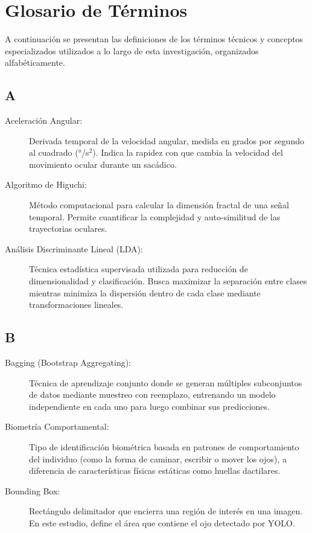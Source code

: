 \chapter*{Glosario de Términos}

A continuación se presentan las definiciones de los términos técnicos y conceptos especializados utilizados a lo largo de esta investigación, organizados alfabéticamente.

\section*{A}

\begin{description}
    \item[Aceleración Angular:] Derivada temporal de la velocidad angular, medida en grados por segundo al cuadrado (°/s$^2$). Indica la rapidez con que cambia la velocidad del movimiento ocular durante un sacádico.
    
    \item[Algoritmo de Higuchi:] Método computacional para calcular la dimensión fractal de una señal temporal. Permite cuantificar la complejidad y auto-similitud de las trayectorias oculares.
    
    \item[Análisis Discriminante Lineal (LDA):] Técnica estadística supervisada utilizada para reducción de dimensionalidad y clasificación. Busca maximizar la separación entre clases mientras minimiza la dispersión dentro de cada clase mediante transformaciones lineales.
\end{description}

\section*{B}

\begin{description}
    \item[Bagging (Bootstrap Aggregating):] Técnica de aprendizaje conjunto donde se generan múltiples subconjuntos de datos mediante muestreo con reemplazo, entrenando un modelo independiente en cada uno para luego combinar sus predicciones.
    
    \item[Biometría Comportamental:] Tipo de identificación biométrica basada en patrones de comportamiento del individuo (como la forma de caminar, escribir o mover los ojos), a diferencia de características físicas estáticas como huellas dactilares.
    
    \item[Bounding Box:] Rectángulo delimitador que encierra una región de interés en una imagen. En este estudio, define el área que contiene el ojo detectado por YOLO.
\end{description}

